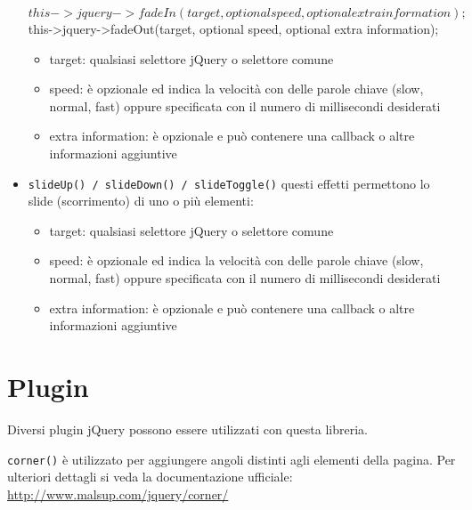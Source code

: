 \begin{itemize}
\begin{code}
$this->jquery->fadeIn(target, optional speed, optional extra information);
$this->jquery->fadeOut(target, optional speed, optional extra information);
\end{code}

\begin{itemize}
\item target: qualsiasi selettore jQuery o selettore comune
\item speed: è opzionale ed indica la velocità con delle parole chiave (slow, normal, fast) oppure specificata con il numero di millisecondi desiderati
\item extra information: è opzionale e può contenere una callback o altre informazioni aggiuntive
\end{itemize}

\item \verb|slideUp() / slideDown() / slideToggle()| questi effetti permettono lo slide (scorrimento) di uno o più elementi:


\begin{itemize}
\item target: qualsiasi selettore jQuery o selettore comune
\item speed: è opzionale ed indica la velocità con delle parole chiave (slow, normal, fast) oppure specificata con il numero di millisecondi desiderati
\item extra information: è opzionale e può contenere una callback o altre informazioni aggiuntive
\end{itemize}
\end{itemize}

\section*{Plugin}
Diversi plugin jQuery possono essere utilizzati con questa libreria.

\verb|corner()| è utilizzato per aggiungere angoli distinti agli elementi della pagina. Per ulteriori dettagli si veda la documentazione ufficiale: \url{http://www.malsup.com/jquery/corner/}

